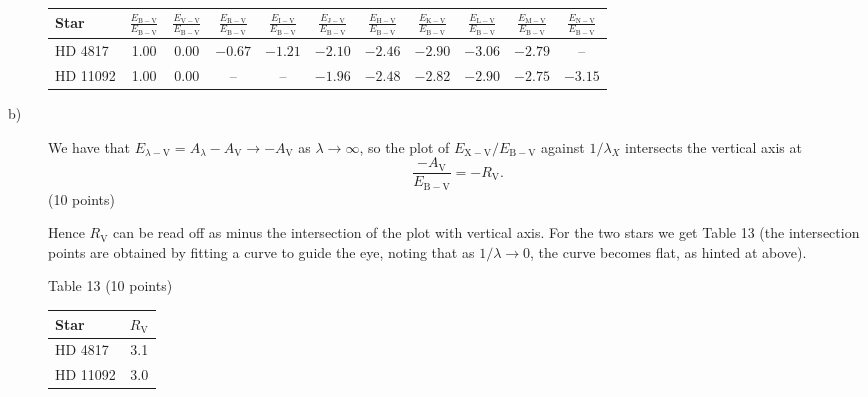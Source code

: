 \begin{description}
\begin{center}
  \begin{tabular}{|l|c|c|c|c|c|c|c|c|c|c|}
  \hline
  Star & $\frac{E_{\mathrm{B-V}}}{E_{\mathrm{B-V}}}$
    & $\frac{E_{\mathrm{V-V}}}{E_{\mathrm{B-V}}}$
    & $\frac{E_{\mathrm{R-V}}}{E_{\mathrm{B-V}}}$
    & $\frac{E_{\mathrm{I-V}}}{E_{\mathrm{B-V}}}$
    & $\frac{E_{\mathrm{J-V}}}{E_{\mathrm{B-V}}}$
    & $\frac{E_{\mathrm{H-V}}}{E_{\mathrm{B-V}}}$
    & $\frac{E_{\mathrm{K-V}}}{E_{\mathrm{B-V}}}$
    & $\frac{E_{\mathrm{L-V}}}{E_{\mathrm{B-V}}}$
    & $\frac{E_{\mathrm{M-V}}}{E_{\mathrm{B-V}}}$
    & $\frac{E_{\mathrm{N-V}}}{E_{\mathrm{B-V}}}$\\
  \hline
  HD 4817 & 1.00 & 0.00 & $-0.67$ & $-1.21$ & $-2.10$ & $-2.46$ & $-2.90$
    & $-3.06$ & $-2.79$ & --\\
  \hline
  HD 11092 & 1.00 & 0.00 & -- & -- & $-1.96$ & $-2.48$ & $-2.82$ & $-2.90$
    & $-2.75$ & $-3.15$\\
  \hline
  \end{tabular}
  \end{center}

\item[b)] We have that
  $E_{\lambda-\mathrm{V}} = A_\lambda - A_{\mathrm{V}}
  \rightarrow -A_{\mathrm{V}}$ as $\lambda\rightarrow\infty$, so the plot of
  $E_{\mathrm{X-V}}/E_{\mathrm{B-V}}$ against $1/\lambda_X$ intersects the
  vertical axis at
  \[ \frac{-A_{\mathrm{V}}}{E_{\mathrm{B-V}}} = -R_{\mathrm{V}}. \]
  \hfill(10 points)

  Hence $R_{\mathrm{V}}$ can be read off as minus the intersection of the
  plot with vertical axis. For the two stars we get Table 13 (the
  intersection points are obtained by fitting a curve to guide the eye,
  noting that as $1/\lambda\rightarrow0$, the curve becomes flat, as hinted
  at above).

  \begin{center}
  Table 13 (10 points)

  \begin{tabular}{|l|c|}
  \hline
  Star & $R_{\mathrm{V}}$\\
  \hline
  HD 4817 & 3.1\\
  \hline
  HD 11092 & 3.0\\
  \hline
  \end{tabular}
  \end{center}


\end{description}

